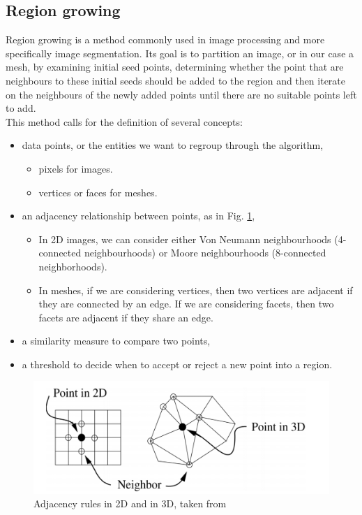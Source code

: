 \documentclass{kththesis}
\begin{document}
\subsection{Region growing} 
Region growing is a method commonly used in image processing and more specifically image segmentation. Its goal is to partition an image, or in our case a mesh, by examining initial seed points, determining whether the point that are neighbours to these initial seeds should be added to the region and then iterate on the neighbours of the newly added points until there are no suitable points left to add.  \\ 
This method calls for the definition of several concepts: 
\begin{itemize}
    \item data points, or the entities we want to regroup through the algorithm,
    \begin{itemize}
        \item pixels for images.
        \item vertices or faces for meshes.
    \end{itemize} 
    \item an adjacency relationship between points, as in Fig. \ref{fig:neighbors},
    \begin{itemize}
        \item In 2D images, we can consider either Von Neumann neighbourhoods (4-connected neighbourhoods) or Moore neighbourhoods (8-connected neighborhoods). 
        \item In meshes, if we are considering vertices, then two vertices are adjacent if they are connected by an edge. If we are considering facets, then two facets are adjacent if they share an edge. 
    \end{itemize}
    \item a similarity measure to compare two points,
    \item a threshold to decide when to accept or reject a new point into a region. 
\end{itemize}

\begin{figure}[H]
    \centering
    \includegraphics[width=\textwidth]{images/neighbors.png}
    \caption{Adjacency rules in 2D and in 3D, taken from \parencite{ManganMeshWatershed}}
    \label{fig:neighbors}
\end{figure}
\end{document}
